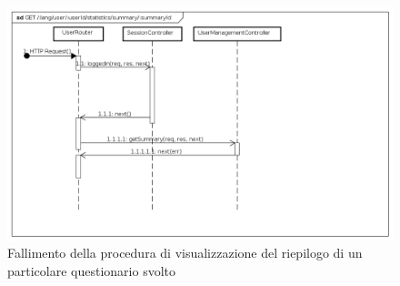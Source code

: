 \begin{itemize}
\label{Fallimento della procedura di visualizzazione del riepilogo di un particolare questionario svolto}
\begin{figure}[ht]
	\centering
	\includegraphics[scale=0.40]{UML/DiagrammiDiSequenza/Back-end/GET_LangUserUserIdStatisticsSummarySummaryIdFailure.png}
	\caption{Fallimento della procedura di visualizzazione del riepilogo di un particolare questionario svolto}
\end{figure}
\FloatBarrier
\end{itemize}



